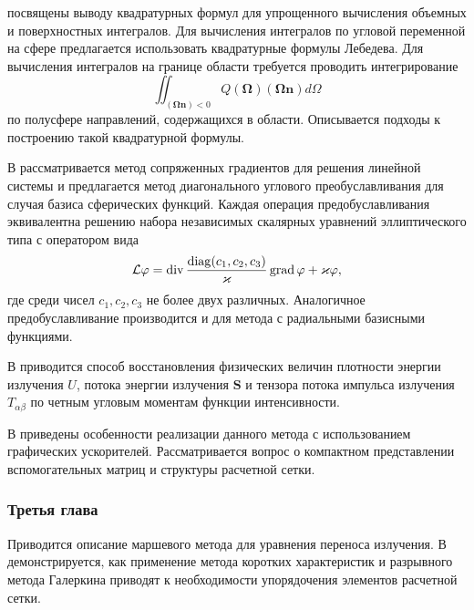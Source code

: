  посвящены выводу квадратурных формул для упрощенного вычисления объемных и поверхностных интегралов. Для вычисления интегралов по угловой переменной на сфере предлагается использовать квадратурные формулы Лебедева. Для вычисления интегралов на границе области требуется проводить интегрирование
\[
\iint_{(\boldsymbol \Omega \mathbf n) < 0}  Q(\boldsymbol \Omega) (\boldsymbol \Omega \mathbf n) d\Omega
\]
по полусфере направлений, содержащихся в области. Описывается подходы к построению такой квадратурной формулы. 

В  рассматривается метод сопряженных градиентов для решения линейной системы и предлагается метод диагонального углового преобуславливания для случая базиса сферических функций. Каждая операция предобуславливания эквивалентна решению набора независимых скалярных уравнений эллиптического типа с оператором вида
\[
\mathcal{L}\varphi = \operatorname{div} \frac{\operatorname{diag}(c_1, c_2, c_3)}{\varkappa}\operatorname{grad} \varphi + \varkappa \varphi,
\]
где среди чисел $c_1, c_2, c_3$ не более двух различных. Аналогичное предобуславливание производится и для метода с радиальными базисными функциями.

В  приводится способ восстановления физических величин плотности энергии излучения $U$, потока энергии излучения $\mathbf S$ и тензора потока импульса излучения $T_{\alpha\beta}$ по четным угловым моментам функции интенсивности.

В  приведены особенности реализации данного метода с использованием графических ускорителей. Рассматривается вопрос о компактном представлении вспомогательных матриц и структуры расчетной сетки.


\subsubsection*{Третья глава}
Приводится описание маршевого метода для уравнения переноса излучения. В  демонстрируется, как применение метода коротких характеристик и разрывного метода Галеркина приводят к необходимости упорядочения элементов расчетной сетки.

